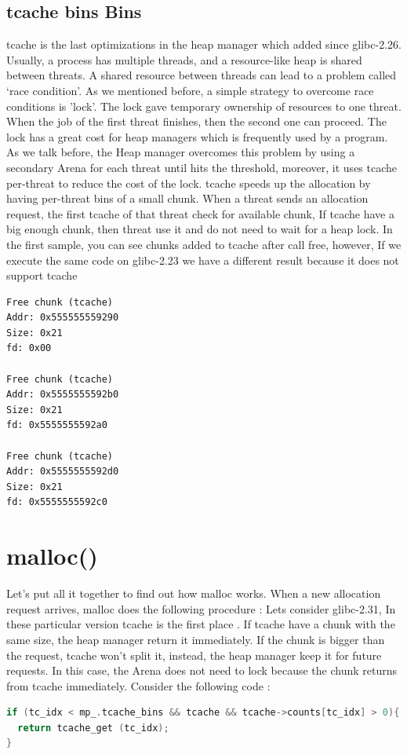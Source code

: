 \documentclass{masterthesis}
\newcommand*\libc{glibc}
\newcommand*\tch{tcache}
\begin{document}
\subsection{\tch{} bins Bins}
\tch{} is the last optimizations in the heap manager which added since \libc{-2.26}. Usually, a process has multiple threads, and a resource-like heap is shared between threats. A shared resource between threads can lead to a problem called ‘race condition’. As we mentioned before, a simple strategy to overcome race conditions is 'lock'. The lock gave temporary ownership of resources to one threat. When the job of the first threat finishes, then the second one can proceed. The lock has a great cost for heap managers which is frequently used by a program. As we talk before, the Heap manager overcomes this problem by using a secondary Arena for each threat until hits the threshold, moreover, it uses \tch{} per-threat to reduce the cost of the lock. \tch{} speeds up the allocation by having per-threat bins of a small chunk. When a threat sends an allocation request, the first \tch{} of that threat check for available chunk, If \tch{} have a big enough chunk, then threat use it and do not need to wait for a heap lock. In the first sample, you can see chunks added to \tch{} after call free, however, If we execute the same code on \libc{-2.23} we have a different result because it does not support \tch{}

\begin{lstlisting}[frame=tlrb]
Free chunk (tcache) 
Addr: 0x555555559290
Size: 0x21
fd: 0x00

Free chunk (tcache) 
Addr: 0x5555555592b0
Size: 0x21
fd: 0x5555555592a0

Free chunk (tcache) 
Addr: 0x5555555592d0
Size: 0x21
fd: 0x5555555592c0
\end{lstlisting}

\section{malloc()}
Let's put all it together to find out how malloc works. When a new allocation request arrives, malloc does the following procedure :
Lets consider \libc{-2.31}, In these particular version \tch{} is the first place . If \tch{} have a chunk with the same size, the heap manager return it immediately. If the chunk is bigger than the request, \tch{} won't split it, instead, the heap manager keep it for future requests. In this case, the Arena does not need to lock because the chunk returns from \tch{} immediately. Consider the following code :
\begin{lstlisting}[language=c,frame=tlrb]
 if (tc_idx < mp_.tcache_bins && tcache && tcache->counts[tc_idx] > 0){
  return tcache_get (tc_idx);
}
\end{lstlisting}
\end{document}
